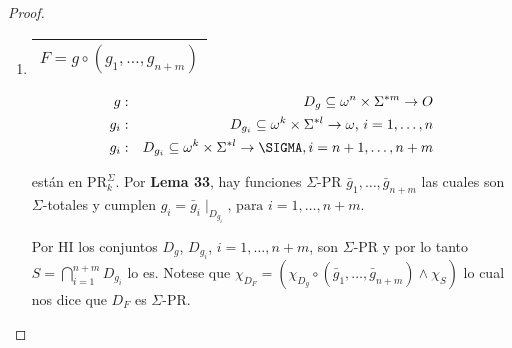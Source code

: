\begin{proof}
\begin{enumerate}
      \item \begin{tabular}{|c|} \hline $F = g \circ (g_{1}, \dotsc, g_{n+m})$\\\hline \end{tabular}
        \begin{eqnarray}
          \nonumber g &:& D_{g} \subseteq \omega^{n} \times \Sigma^{\ast m} \rightarrow O \\
          \nonumber g_{i} &:& D_{g_{i}} \subseteq \omega^{k} \times \Sigma^{\ast l} \rightarrow \omega \text{, } i = 1,
          \dotsc, n \\
          \nonumber g_{i} &:& D_{g_{i}} \subseteq \omega^{k} \times \Sigma^{\ast l} \rightarrow \SIGMA, i = n + 1,
          \dotsc, n + m
        \end{eqnarray}

        \par están en $\mathrm{PR}_{k}^{\Sigma}$. Por \textbf{Lema 33}, hay funciones $\Sigma$-PR $\bar{g}_{1}, \dotsc,
        \bar{g}_{n+m}$ las cuales son $\Sigma$-totales y cumplen $g_{i} = \bar{g}_{i} \mid_{D_{g_{i}}} \text{, para }
        i = 1, \dotsc, n + m$.

        \par Por HI los conjuntos $D_{g}$, $D_{g_{i}}$, $i = 1, \dotsc, n + m$, son $\Sigma$-PR y por lo tanto
        $S = \bigcap_{i=1}^{n+m} D_{g_{i}}$ lo es. Notese que $\chi_{D_{F}} = (\chi_{D_{g}} \circ (\bar{g}_{1}, \dotsc,
        \bar{g}_{n+m}) \wedge \chi_{S})$ lo cual nos dice que $D_{F}$ es $\Sigma$-PR.
    \end{enumerate}
  \end{proof}
